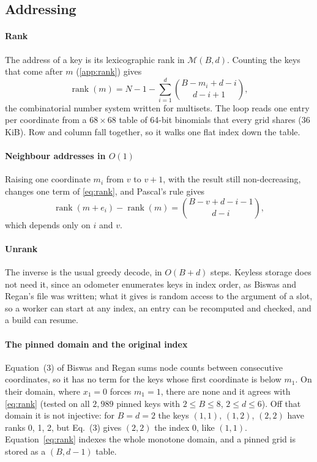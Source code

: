 \documentclass[preprint,12pt]{elsarticle}
\newcommand{\rank}{\operatorname{rank}}
\begin{document}


\subsection{Addressing}\label{sec:index}

\paragraph{Rank} The address of a key is its lexicographic rank in
$\mathcal{M}(B,d)$. Counting the keys that come after $m$ (\ref{app:rank}) gives
\begin{equation}\label{eq:rank}
\rank(m)=N-1-\sum_{i=1}^{d}\binom{B-m_i+d-i}{d-i+1},
\end{equation}
the combinatorial number system\cite{knuth2011} written for multisets. The loop reads one
entry per coordinate from a $68\times68$ table of 64-bit binomials that every grid
shares (36\,KiB). Row and column fall together, so it walks one flat index down the
table.

\paragraph{Neighbour addresses in $O(1)$} Raising one coordinate $m_i$ from $v$
to $v{+}1$, with the result still non-decreasing, changes one term of
\eqref{eq:rank}, and Pascal's rule gives
\begin{equation}\label{eq:step}
\rank(m+e_i)-\rank(m)=\binom{B-v+d-i-1}{d-i},
\end{equation}
which depends only on $i$ and $v$.

\paragraph{Unrank} The inverse is the usual greedy decode,\cite{knuth2011} in $O(B+d)$ steps. Keyless storage does not need it, since an odometer enumerates keys in index order, as Biswas and Regan's file was written; what it gives is random access to the argument of a slot, so a worker can start at any index, an entry can be recomputed and checked, and a build can resume.

\paragraph{The pinned domain and the original index} Equation~(3) of Biswas and Regan
sums node counts between consecutive coordinates, so it has no term for the keys
whose first coordinate is below $m_1$. On their domain, where $x_1=0$ forces
$m_1=1$, there are none and it agrees with \eqref{eq:rank} (tested on all $2{,}989$ pinned keys with $2\le B\le8$, $2\le d\le6$). Off that domain it is not injective:
for $B=d=2$ the keys $(1,1)$, $(1,2)$, $(2,2)$ have ranks 0, 1, 2, but Eq.~(3) gives
$(2,2)$ the index 0, like $(1,1)$. Equation~\eqref{eq:rank} indexes the whole monotone
domain, and a pinned grid is stored as a $(B,d-1)$ table.
\end{document}
